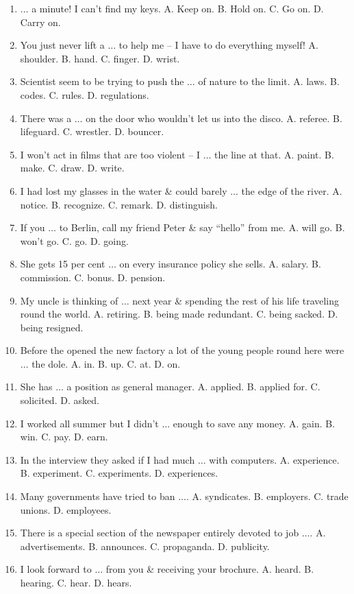 \documentclass{article}
\numberwithin{equation}{section}
\begin{document}
\begin{enumerate}[leftmargin=5mm]
	\item $\ldots$ a minute! I can't find my keys. A. Keep on. B. Hold on. C. Go on. D. Carry on.
	\item You just never lift a $\ldots$ to help me -- I have to do everything myself! A. shoulder. B. hand. C. finger. D. wrist.
	\item Scientist seem to be trying to push the $\ldots$ of nature to the limit. A. laws. B. codes. C. rules. D. regulations.
	\item There was a $\ldots$ on the door who wouldn't let us into the disco. A. referee. B. lifeguard. C. wrestler. D. bouncer.
	\item I won't act in films that are too violent -- I $\ldots$ the line at that. A. paint. B. make. C. draw. D. write.
	\item I had lost my glasses in the water \& could barely $\ldots$ the edge of the river. A. notice. B. recognize. C. remark. D. distinguish.
	\item If you $\ldots$ to Berlin, call my friend Peter \& say ``hello'' from me. A. will go. B. won't go. C. go. D. going.
	\item She gets 15 per cent $\ldots$ on every insurance policy she sells. A. salary. B. commission. C. bonus. D. pension.
	\item My uncle is thinking of $\ldots$ next year \& spending the rest of his life traveling round the world. A. retiring. B. being made redundant. C. being sacked. D. being resigned.
	\item Before the opened the new factory a lot of the young people round here were $\ldots$ the dole. A. in. B. up. C. at. D. on.
	\item She has $\ldots$ a position as general manager. A. applied. B. applied for. C. solicited. D. asked.
	\item I worked all summer but I didn't $\ldots$ enough to save any money. A. gain. B. win. C. pay. D. earn.
	\item In the interview they asked if I had much $\ldots$ with computers. A. experience. B. experiment. C. experiments. D. experiences.
	\item Many governments have tried to ban $\ldots$. A. syndicates. B. employers. C. trade unions. D. employees.
	\item There is a special section of the newspaper entirely devoted to job $\ldots$. A. advertisements. B. announces. C. propaganda. D. publicity.
	\item I look forward to $\ldots$ from you \& receiving your brochure. A. heard. B. hearing. C. hear. D. hears.

\end{enumerate}
\end{document}
